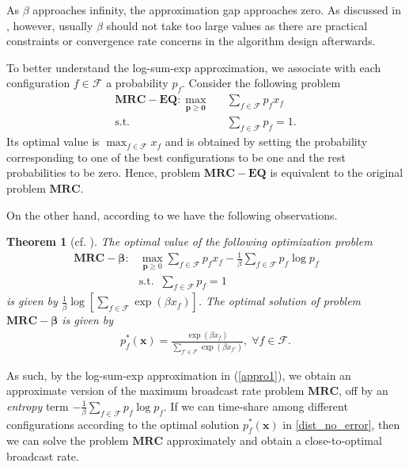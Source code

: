 \documentclass[10pt,conference]{IEEEtran}
\newtheorem{theorem}{\bf Theorem}
\begin{document}
As $\beta$ approaches infinity, the approximation gap approaches
zero. As discussed in \cite{MA:CLSC10}, however, usually $\beta$ should not
take too large values as there are practical constraints or convergence
rate concerns in the algorithm design afterwards.

To better understand the log-sum-exp approximation, we associate with each configuration $f\in\mathcal{F}$
a probability $p_{f}$. Consider the following problem
\begin{eqnarray}
\mathbf{MRC-EQ:}\max_{\boldsymbol{p\geq0}} &  & \sum_{f\in\mathcal{F}}p_{f}x_{f}\\
\mbox{s.t.} &  & \sum_{f\in\mathcal{F}}p_{f}=1.\end{eqnarray}
Its optimal value is $\max_{f\in \mathcal{F}} x_f$ and is obtained by setting the probability corresponding to one of the best configurations
to be one and the rest probabilities to be zero. Hence, problem $\mathbf{MRC-EQ}$
is equivalent to the original problem $\mathbf{MRC}$.

On the other hand, according to \cite{MA:CLSC10} we have the following
observations.
\begin{theorem}[cf. \cite{MA:CLSC10}] The optimal value of the following
optimization problem \begin{align}
\mathbf{MRC-\beta:} & \max_{\boldsymbol{p}\geq0}\sum_{f\in\mathcal{F}}p_{f}x_{f}-\frac{1}{\beta}\sum_{f\in\mathcal{F}}p_{f}\log p_{f}\;\;\;\;\;\;\label{conju}\\
 & \mbox{s.t.}\;\;\sum_{f\in\mathcal{F}}p_{f}=1\label{conju_cs}\end{align}
is given by $\frac{1}{\beta}\log\left[\sum_{f\in\mathcal{F}}\exp\left(\beta x_{f}\right)\right]$.
The optimal solution of problem $\mathbf{MRC-\beta}$ is given by
\begin{align}
p_{f}^{*}(\boldsymbol{x})=\frac{\exp\left(\beta x_{f}\right)}{\sum\limits _{f'\in\mathcal{F}}\exp\left(\beta x_{f'}\right)},\;\forall f\in\mathcal{F}.\label{dist_no_error}\end{align}
 \end{theorem}

As such, by the log-sum-exp approximation in (\ref{appro1}),
we obtain an approximate version of the maximum broadcast rate problem
$\mathbf{MRC}$, off by an \emph{entropy }term $-\frac{1}{\beta}\sum_{f\in\mathcal{F}}p_{f}\log p_{f}$.
If we can time-share among different configurations according
to the optimal solution $p_{f}^{*}(\boldsymbol{x})$ in \eqref{dist_no_error},
then we can solve the problem $\mathbf{MRC}$ approximately and obtain
a close-to-optimal broadcast rate.
\end{document}
